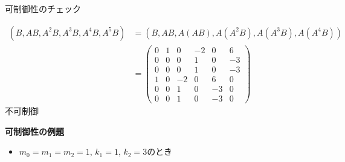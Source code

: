 \documentclass[a4paper,11pt,fleqn]{jreport}
\begin{document}
可制御性のチェック

\begin{align}
 (B,AB, A^2B, A^3B, A^4B, A^5B)
 &=
 (B,AB, A(AB), A(A^2B), A(A^3B), A(A^4B))
\nonumber \\
 &=
 \left(\begin{array}{rrrrrr}
        0 & 1 & 0 & -2& 0 & 6      \\
        0 & 0 & 0 & 1 & 0 & -3      \\
        0 & 0 & 0 & 1 & 0 & -3      \\
	1 & 0 & -2& 0 & 6 & 0 \\
	0 & 0 & 1 & 0 & -3& 0 \\
	0 & 0 & 1 & 0 & -3& 0 
       \end{array}\right)
\nonumber
\end{align}
不可制御

\newpage
\noindent
{\bf 可制御性の例題}

\begin{itemize}
\item $m_0=m_1=m_2=1$, $k_1=1$, $k_2=3$のとき
\end{itemize}
\end{document}
